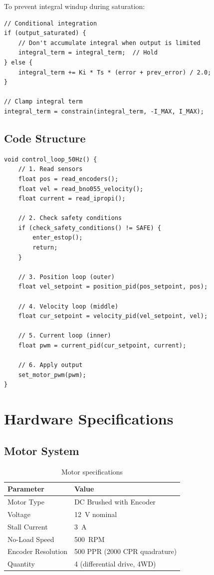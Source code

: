 \documentclass[11pt,letterpaper]{article}
\begin{document}
To prevent integral windup during saturation:

\begin{verbatim}
// Conditional integration
if (output_saturated) {
    // Don't accumulate integral when output is limited
    integral_term = integral_term;  // Hold
} else {
    integral_term += Ki * Ts * (error + prev_error) / 2.0;
}

// Clamp integral term
integral_term = constrain(integral_term, -I_MAX, I_MAX);
\end{verbatim}

\subsection{Code Structure}

\begin{verbatim}
void control_loop_50Hz() {
    // 1. Read sensors
    float pos = read_encoders();
    float vel = read_bno055_velocity();
    float current = read_ipropi();

    // 2. Check safety conditions
    if (check_safety_conditions() != SAFE) {
        enter_estop();
        return;
    }

    // 3. Position loop (outer)
    float vel_setpoint = position_pid(pos_setpoint, pos);

    // 4. Velocity loop (middle)
    float cur_setpoint = velocity_pid(vel_setpoint, vel);

    // 5. Current loop (inner)
    float pwm = current_pid(cur_setpoint, current);

    // 6. Apply output
    set_motor_pwm(pwm);
}
\end{verbatim}

\newpage
\section{Hardware Specifications}

\subsection{Motor System}

\begin{table}[H]
\centering
\begin{tabular}{@{}ll@{}}
\toprule
\textbf{Parameter} & \textbf{Value} \\
\midrule
Motor Type & DC Brushed with Encoder \\
Voltage & \SI{12}{\volt} nominal \\
Stall Current & \SI{3}{\ampere} \\
No-Load Speed & \SI{500}{RPM} \\
Encoder Resolution & 500 PPR (2000 CPR quadrature) \\
Quantity & 4 (differential drive, 4WD) \\
\bottomrule
\end{tabular}
\caption{Motor specifications}
\end{table}
\end{document}
